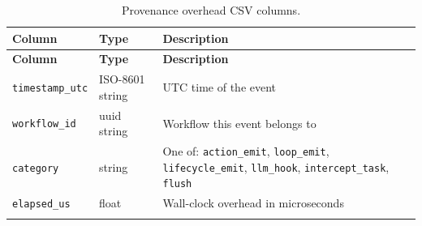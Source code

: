 \documentclass[11pt,a4paper]{article}
\begin{document}
\begin{longtable}{L{3.5cm} L{2.5cm} L{7.5cm}}
\toprule
\textbf{Column} & \textbf{Type} & \textbf{Description} \\
\midrule
\endfirsthead
\toprule \textbf{Column} & \textbf{Type} & \textbf{Description} \\
\midrule
\endhead
\bottomrule
\endlastfoot

\texttt{timestamp\_utc} & ISO-8601 string & UTC time of the event \\
\texttt{workflow\_id}   & uuid string & Workflow this event belongs to \\
\texttt{category}       & string
  & One of: \texttt{action\_emit}, \texttt{loop\_emit},
    \texttt{lifecycle\_emit}, \texttt{llm\_hook},
    \texttt{intercept\_task}, \texttt{flush} \\
\texttt{elapsed\_us}    & float & Wall-clock overhead in microseconds \\

\caption{Provenance overhead CSV columns.}
\end{longtable}
\end{document}
